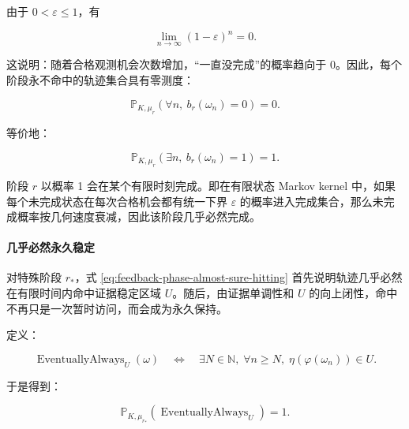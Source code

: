     由于 $0<\varepsilon\le 1$，有

    \begin{equation}
    \boxed{
      \lim_{n\rightarrow\infty}(1-\varepsilon)^n=0.}
      \label{eq:feedback-geometric-limit}
    \end{equation}

    这说明：随着合格观测机会次数增加，“一直没完成”的概率趋向于 0。因此，每个阶段永不命中的轨迹集合具有零测度：

    \begin{equation}
      \boxed{
        \mathbb P_{K,\mu_r}
        \left(
          \forall n,\ b_r(\omega_n)=0
        \right)
        =0.
      }
      \label{eq:feedback-phase-never-hit-zero}
    \end{equation}

    等价地：

    \begin{equation}
      \boxed{
        \mathbb P_{K,\mu_r}
        \left(
          \exists n,\ b_r(\omega_n)=1
        \right)
        =1.
      }
      \label{eq:feedback-phase-almost-sure-hitting}
    \end{equation}

    阶段 $r$ 以概率 1 会在某个有限时刻完成。即在有限状态 Markov kernel 中，如果每个未完成状态在每次合格机会都有统一下界 $\varepsilon$ 的概率进入完成集合，那么未完成概率按几何速度衰减，因此该阶段几乎必然完成。

    \paragraph{几乎必然永久稳定}

    对特殊阶段 $r_\ast$，式
    \eqref{eq:feedback-phase-almost-sure-hitting} 首先说明轨迹几乎必然在有限时间内命中证据稳定区域 $U$。随后，由证据单调性和 $U$ 的向上闭性，命中不再只是一次暂时访问，而会成为永久保持。

    定义：

    \begin{equation}
      \boxed{
        \operatorname{EventuallyAlways}_{U}(\omega)
        \quad\Longleftrightarrow\quad
        \exists N\in\mathbb N,\;
        \forall n\ge N,\;
        \eta(\varphi(\omega_n))\in U.
      }
      \label{eq:feedback-eventually-always-stable}
    \end{equation}

    于是得到：

    \begin{equation}
      \boxed{
        \mathbb P_{K,\mu_{r_\ast}}
        \left(
          \operatorname{EventuallyAlways}_{U}
        \right)
        =1.
      }
      \label{eq:feedback-almost-sure-stabilization}
    \end{equation}

